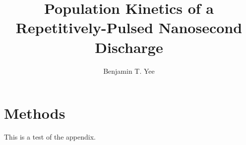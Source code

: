 \documentclass[12pt]{./tex/thesis-umich}
\title{Population Kinetics of a Repetitively-Pulsed Nanosecond Discharge}
\author{Benjamin T. Yee}
\begin{document}


  



  \appendix
    \chapter{Methods}
      This is a test of the appendix.


\end{document}
